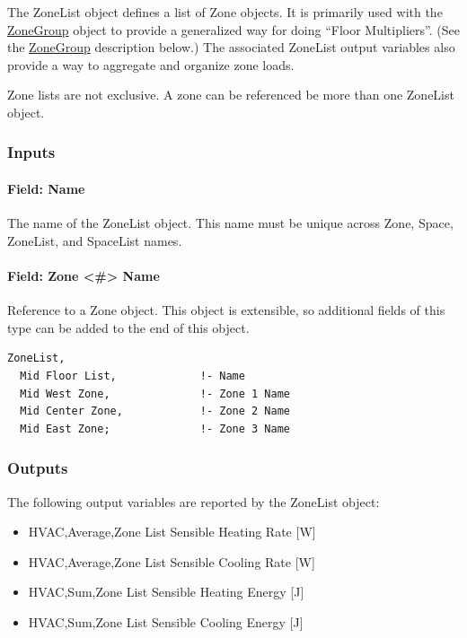 The ZoneList object defines a list of Zone objects. It is primarily used with the \hyperref[zonegroup]{ZoneGroup} object to provide a generalized way for doing ``Floor Multipliers''. (See the \hyperref[zonegroup]{ZoneGroup} description below.) The associated ZoneList output variables also provide a way to aggregate and organize zone loads.

Zone lists are not exclusive. A zone can be referenced be more than one ZoneList object.

\subsubsection{Inputs}\label{inputs-1-045}

\paragraph{Field: Name}\label{field-zone-list-name-000}

The name of the ZoneList object. This name must be unique across Zone, Space, ZoneList, and SpaceList names.

\paragraph{Field: Zone \textless{}\#\textgreater{} Name}\label{field-zone-1---zone-20-name}

Reference to a Zone object. This object is extensible, so additional fields of this type can be added to the end of this object.

\begin{lstlisting}
ZoneList,
  Mid Floor List,             !- Name
  Mid West Zone,              !- Zone 1 Name
  Mid Center Zone,            !- Zone 2 Name
  Mid East Zone;              !- Zone 3 Name
\end{lstlisting}

\subsubsection{Outputs}\label{outputs-1-028}

The following output variables are reported by the ZoneList object:

\begin{itemize}
\item
  HVAC,Average,Zone List Sensible Heating Rate {[}W{]}
\item
  HVAC,Average,Zone List Sensible Cooling Rate {[}W{]}
\item
  HVAC,Sum,Zone List Sensible Heating Energy {[}J{]}
\item
  HVAC,Sum,Zone List Sensible Cooling Energy {[}J{]}
\end{itemize}

